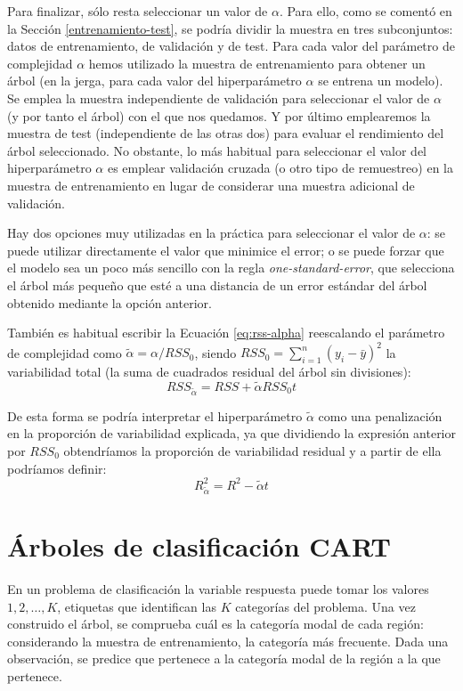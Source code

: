 \documentclass[
  spanish,
]{book}
\theoremstyle{break}
\theoremstyle{definition}
\theoremstyle{definition}
\theoremstyle{definition}
\theoremstyle{definition}
\theoremstyle{remark}
\begin{document}
Para finalizar, sólo resta seleccionar un valor de \(\alpha\).
Para ello, como se comentó en la Sección \ref{entrenamiento-test}, se podría dividir la muestra en tres subconjuntos: datos de entrenamiento, de validación y de test.
Para cada valor del parámetro de complejidad \(\alpha\) hemos utilizado la muestra de entrenamiento para obtener un árbol
(en la jerga, para cada valor del hiperparámetro \(\alpha\) se entrena un modelo).
Se emplea la muestra independiente de validación para seleccionar el valor de \(\alpha\) (y por tanto el árbol) con el que nos quedamos.
Y por último emplearemos la muestra de test (independiente de las otras dos) para evaluar el rendimiento del árbol seleccionado.
No obstante, lo más habitual para seleccionar el valor del hiperparámetro \(\alpha\) es emplear validación cruzada (o otro tipo de remuestreo) en la muestra de entrenamiento en lugar de considerar una muestra adicional de validación.

Hay dos opciones muy utilizadas en la práctica para seleccionar el valor de \(\alpha\):
se puede utilizar directamente el valor que minimice el error; o se puede forzar
que el modelo sea un poco más sencillo con la regla \emph{one-standard-error}, que selecciona
el árbol más pequeño que esté a una distancia de un error estándar del árbol obtenido
mediante la opción anterior.

También es habitual escribir la Ecuación \eqref{eq:rss-alpha} reescalando el parámetro de complejidad como \(\tilde \alpha = \alpha / RSS_0\), siendo \(RSS_0 = \sum_{i=1}^{n} (y_i - \bar y)^2\) la variabilidad total (la suma de cuadrados residual del árbol sin divisiones):
\[RSS_{\tilde \alpha}=RSS + \tilde \alpha RSS_0 t\]

De esta forma se podría interpretar el hiperparámetro \(\tilde \alpha\) como una penalización en la proporción de variabilidad explicada, ya que dividiendo la expresión anterior por \(RSS_0\) obtendríamos la proporción de variabilidad residual y a partir de ella podríamos definir:
\[R^2_{\tilde \alpha}=R^2 - \tilde \alpha  t\]

\hypertarget{uxe1rboles-de-clasificaciuxf3n-cart}{%
\section{Árboles de clasificación CART}\label{uxe1rboles-de-clasificaciuxf3n-cart}}

En un problema de clasificación la variable respuesta puede tomar los valores
\(1, 2, \ldots, K\), etiquetas que identifican las \(K\) categorías del problema.
Una vez construido el árbol, se comprueba cuál es la categoría modal de cada
región: considerando la muestra de entrenamiento, la categoría más frecuente.
Dada una observación, se predice que pertenece a la categoría modal de la
región a la que pertenece.
\end{document}
